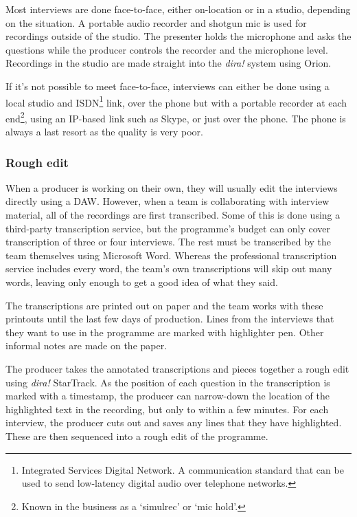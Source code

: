Most interviews are done face-to-face, either on-location or in a studio,
depending on the situation. A portable audio recorder and shotgun mic is used
for recordings outside of the studio. The presenter holds the microphone and
asks the questions while the producer controls the recorder and the microphone
level. Recordings in the studio are made straight into the \textit{dira!}
system using Orion.

If it's not possible to meet face-to-face, interviews can either be done using
a local studio and ISDN\footnote{Integrated Services Digital Network.  A
  communication standard that can be used to send low-latency digital audio
  over telephone networks.} link, over the phone but with a portable recorder
at each end\footnote{Known in the business as a `simulrec' or `mic hold'.},
using an IP-based link such as Skype, or just over the phone. The phone is
always a last resort as the quality is very poor.

\subsubsection{Rough edit}
When a producer is working on their own, they will usually edit the interviews
directly using a DAW. However, when a team is collaborating with 
interview material, all of the recordings are first transcribed. Some of
this is done using a third-party transcription service, but the programme's
budget can only cover transcription of three or four interviews. The rest must
be transcribed by the team themselves using Microsoft Word. Whereas the
professional transcription service includes every word, the team's own
transcriptions will skip out many words, leaving only enough to get a good idea
of what they said.

The transcriptions are printed out on paper and the team works with these
printouts until the last few days of production. Lines from the interviews that
they want to use in the programme are marked with highlighter pen. Other
informal notes are made on the paper.

The producer takes the annotated transcriptions and pieces together a rough
edit using \textit{dira!} StarTrack. As the position of each question in the
transcription is marked with a timestamp, the producer can narrow-down the
location of the highlighted text in the recording, but only to within a few
minutes. For each interview, the producer cuts out and saves any lines that
they have highlighted. These are then sequenced into a rough edit of the
programme.

